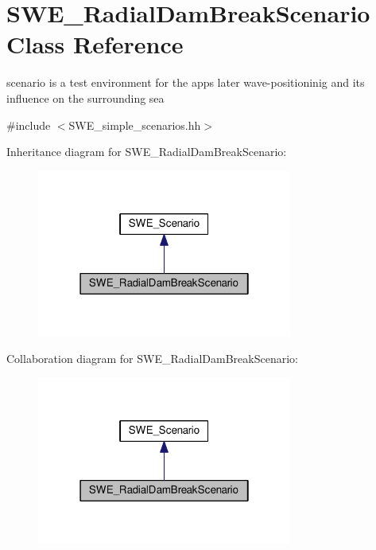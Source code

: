 \hypertarget{classSWE__RadialDamBreakScenario}{}\section{S\+W\+E\+\_\+\+Radial\+Dam\+Break\+Scenario Class Reference}
\label{classSWE__RadialDamBreakScenario}


scenario is a test environment for the apps later wave-\/positioninig and its influence on the surrounding sea  




{\ttfamily \#include $<$S\+W\+E\+\_\+simple\+\_\+scenarios.\+hh$>$}



Inheritance diagram for S\+W\+E\+\_\+\+Radial\+Dam\+Break\+Scenario\+:\nopagebreak
\begin{figure}[H]
\begin{center}
\leavevmode
\includegraphics[width=238pt]{classSWE__RadialDamBreakScenario__inherit__graph}
\end{center}
\end{figure}


Collaboration diagram for S\+W\+E\+\_\+\+Radial\+Dam\+Break\+Scenario\+:\nopagebreak
\begin{figure}[H]
\begin{center}
\leavevmode
\includegraphics[width=238pt]{classSWE__RadialDamBreakScenario__coll__graph}
\end{center}
\end{figure}
